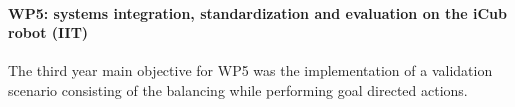 \paragraph{WP5: systems integration, standardization and evaluation on the iCub robot (IIT)}

The third year main objective for WP5 was the implementation of a validation scenario consisting of the balancing while performing goal directed actions. 
